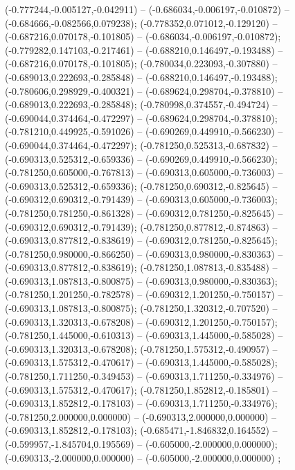  (-0.777244,-0.005127,-0.042911) -- (-0.686034,-0.006197,-0.010872) -- (-0.684666,-0.082566,0.079238);
 (-0.778352,0.071012,-0.129120) -- (-0.687216,0.070178,-0.101805) -- (-0.686034,-0.006197,-0.010872);
 (-0.779282,0.147103,-0.217461) -- (-0.688210,0.146497,-0.193488) -- (-0.687216,0.070178,-0.101805);
 (-0.780034,0.223093,-0.307880) -- (-0.689013,0.222693,-0.285848) -- (-0.688210,0.146497,-0.193488);
 (-0.780606,0.298929,-0.400321) -- (-0.689624,0.298704,-0.378810) -- (-0.689013,0.222693,-0.285848);
 (-0.780998,0.374557,-0.494724) -- (-0.690044,0.374464,-0.472297) -- (-0.689624,0.298704,-0.378810);
 (-0.781210,0.449925,-0.591026) -- (-0.690269,0.449910,-0.566230) -- (-0.690044,0.374464,-0.472297);
 (-0.781250,0.525313,-0.687832) -- (-0.690313,0.525312,-0.659336) -- (-0.690269,0.449910,-0.566230);
 (-0.781250,0.605000,-0.767813) -- (-0.690313,0.605000,-0.736003) -- (-0.690313,0.525312,-0.659336);
 (-0.781250,0.690312,-0.825645) -- (-0.690312,0.690312,-0.791439) -- (-0.690313,0.605000,-0.736003);
 (-0.781250,0.781250,-0.861328) -- (-0.690312,0.781250,-0.825645) -- (-0.690312,0.690312,-0.791439);
 (-0.781250,0.877812,-0.874863) -- (-0.690313,0.877812,-0.838619) -- (-0.690312,0.781250,-0.825645);
 (-0.781250,0.980000,-0.866250) -- (-0.690313,0.980000,-0.830363) -- (-0.690313,0.877812,-0.838619);
 (-0.781250,1.087813,-0.835488) -- (-0.690313,1.087813,-0.800875) -- (-0.690313,0.980000,-0.830363);
 (-0.781250,1.201250,-0.782578) -- (-0.690312,1.201250,-0.750157) -- (-0.690313,1.087813,-0.800875);
 (-0.781250,1.320312,-0.707520) -- (-0.690313,1.320313,-0.678208) -- (-0.690312,1.201250,-0.750157);
 (-0.781250,1.445000,-0.610313) -- (-0.690313,1.445000,-0.585028) -- (-0.690313,1.320313,-0.678208);
 (-0.781250,1.575312,-0.490957) -- (-0.690313,1.575312,-0.470617) -- (-0.690313,1.445000,-0.585028);
 (-0.781250,1.711250,-0.349453) -- (-0.690313,1.711250,-0.334976) -- (-0.690313,1.575312,-0.470617);
 (-0.781250,1.852812,-0.185801) -- (-0.690313,1.852812,-0.178103) -- (-0.690313,1.711250,-0.334976);
 (-0.781250,2.000000,0.000000) -- (-0.690313,2.000000,0.000000) -- (-0.690313,1.852812,-0.178103);
 (-0.685471,-1.846832,0.164552) -- (-0.599957,-1.845704,0.195569) -- (-0.605000,-2.000000,0.000000);
 (-0.690313,-2.000000,0.000000) -- (-0.605000,-2.000000,0.000000) ;
